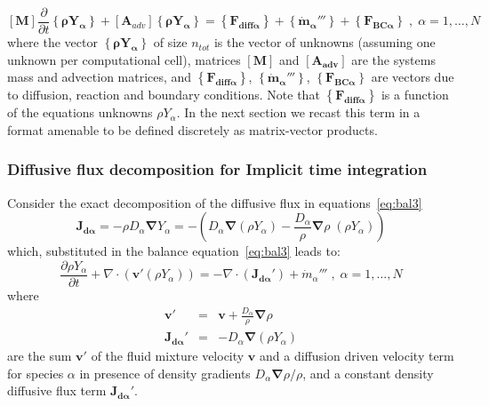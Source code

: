 \documentclass[12pt]{article}
\begin{document}
%
\begin{equation}
\left[ \mathbf{M} \right] \frac{\partial}{\partial t} \left\{ \mathbf{\rho Y_\alpha} \right\} + \left[ \mathbf{A}_{adv}  \right] \left\{ \mathbf{\rho Y_\alpha} \right\} = \left\{ \mathbf{F_{diff \alpha}} \right\} + \left\{  \mathbf{\dot{m}_\alpha'''} \right\} +  \left\{ \mathbf{F_{BC \alpha}} \right\} \; , \; \alpha=1,\dots,N \label{eq:discbal3}
\end{equation}
%
where the vector $\left\{ \mathbf{\rho Y_\alpha} \right\}$ of size $n_{tot}$ is the vector of unknowns (assuming one unknown per computational cell), matrices $\left[ \mathbf{M} \right]$ and $ \left[ \mathbf{A_{adv}}  \right]$ are the systems mass and advection matrices, and $\left\{ \mathbf{F_{diff \alpha}} \right\}$, $\left\{  \mathbf{\dot{m}_\alpha'''} \right\}$, $\left\{ \mathbf{F_{BC \alpha}} \right\}$ are vectors due to diffusion, reaction and boundary conditions. Note that $\left\{ \mathbf{F_{diff \alpha}} \right\}$ is a function of the equations unknowns $\rho Y_\alpha$. In the next section we recast this term in a format amenable to be defined discretely as matrix-vector products.


\subsubsection*{Diffusive flux decomposition for Implicit time integration}

Consider the exact decomposition of the diffusive flux in equations~\eqref{eq:bal3}
%
\begin{equation}
   \mathbf{J_{d \alpha}} = - \rho D_\alpha \boldsymbol{\nabla} Y_\alpha =  - \left( D_\alpha \boldsymbol{\nabla} ( \rho Y_\alpha) 
   - \frac{D_\alpha}{\rho} \boldsymbol{\nabla} \rho \; ( \rho Y_\alpha) \right) \label{eq:expdfl2} 
\end{equation}
%
which, substituted in the balance equation~\eqref{eq:bal3} leads to:
%
\begin{equation}
 \frac{\partial \rho Y_\alpha}{ \partial t} + \nabla \cdot \left(  \mathbf{v}' (\rho Y_\alpha)   \right) = - \nabla \cdot \left(  \mathbf{J_{d \alpha}'} \right) + \dot{m}_\alpha''' \; , \; \alpha=1,\dots,N \label{eq:bal4}
\end{equation}
%
where
%
\begin{eqnarray}
  \mathbf{v}' &=& \mathbf{v} + \frac{D_\alpha}{\rho} \boldsymbol{\nabla} \rho  \label{eq:vprime} \\
   \mathbf{J_{d \alpha}'} &=& -D_\alpha \boldsymbol{\nabla}  (\rho Y_\alpha )  \label{eq:jdaprime}
\end{eqnarray}
%
are the sum $\mathbf{v}'$ of the fluid mixture velocity $\mathbf{v}$ and a diffusion driven velocity term for species $\alpha$ in presence of density gradients $D_\alpha \boldsymbol{\nabla} \rho / \rho $, and a constant density diffusive flux term $\mathbf{J_{d \alpha}'}$. 
\end{document}
